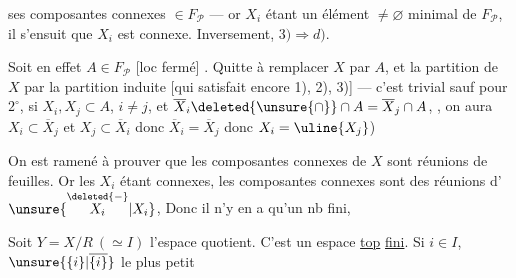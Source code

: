 
 ses composantes connexes  $\in F_{\mathcal P}$ --- or $X_i$ étant un élément $\ne\varnothing$ minimal de $F_{\mathcal P}$, il s'ensuit que $X_i$ est connexe. Inversement, $3)\Longrightarrow d)$.

Soit en effet $A\in F_{\mathcal P}$ [loc fermé] . Quitte à remplacer $X$ par $A$, et la partition de $X$ par la partition induite [qui satisfait encore 1), 2), 3)] ---  c'est trivial sauf pour $2^\circ$,   si $X_i,X_j\subset A$, $i\ne j$, et $\overline X_i\deleted{\unsure{\cap}}\cap A=\overline X_j\cap A$, , on aura $X_i\subset\overline X_j$ et $X_j\subset\overline X_i$ donc $\overline X_i=\overline X_j$ donc $X_i=\uline{X_j}$)

On est ramené à prouver  que les composantes connexes  de $X$ sont  réunions de feuilles. Or les $X_i$ étant connexes,   les composantes connexes  sont  des réunions d' $\unsure{\overset{\deleted{-}}{X_i}|X_i}$,  Donc il n'y en a qu'un nb fini, 

Soit $Y=X/R\ (\simeq I)$ l'espace quotient. C'est un espace \uline{top} \uline{fini}.  Si $i\in I$, $\unsure{\{i\}|\overline{\{i\}}}$ le plus petit

